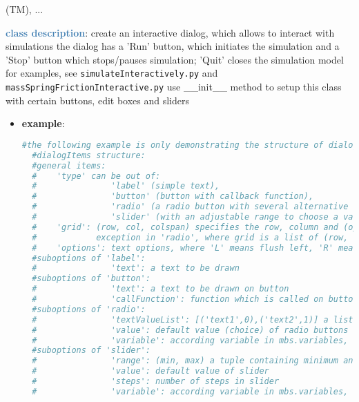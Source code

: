 \begin{itemize}[leftmargin=1.4cm]
\begin{itemize}[leftmargin=1.4cm]
\begin{itemize}[leftmargin=0.5cm]
\begin{itemize}[leftmargin=1.4cm]
\begin{itemize}[leftmargin=1.4cm]
\begin{itemize}[leftmargin=0.5cm]
\begin{itemize}[leftmargin=1.4cm]
\begin{itemize}[leftmargin=0.5cm]
\begin{itemize}[leftmargin=1.4cm]
\begin{itemize}[leftmargin=1.4cm]
 (TM), 
 ...

\ei

%
\noindent\textcolor{steelblue}{{\bf class description}}:  create an interactive dialog, which allows to interact with simulations
the dialog has a 'Run' button, which initiates the simulation and a 'Stop' button which stops/pauses simulation; 'Quit' closes the simulation model
for examples, see \texttt{simulateInteractively.py} and \texttt{massSpringFrictionInteractive.py}
use \_\_init\_\_ method to setup this class with certain buttons, edit boxes and sliders
\setlength{\itemindent}{0.7cm}
\begin{itemize}[leftmargin=0.7cm]
\item[--]{\bf example}: \vspace{-12pt}\ei\begin{lstlisting}[language=Python, xleftmargin=36pt]
  #the following example is only demonstrating the structure of dialogItems and plots
  #dialogItems structure:
  #general items:
  #    'type' can be out of:
  #               'label' (simple text),
  #               'button' (button with callback function),
  #               'radio' (a radio button with several alternative options),
  #               'slider' (with an adjustable range to choose a value)
  #    'grid': (row, col, colspan) specifies the row, column and (optionally) the span of columns the item is placed at;
  #            exception in 'radio', where grid is a list of (row, col) for every choice
  #    'options': text options, where 'L' means flush left, 'R' means flush right
  #suboptions of 'label':
  #               'text': a text to be drawn
  #suboptions of 'button':
  #               'text': a text to be drawn on button
  #               'callFunction': function which is called on button-press
  #suboptions of 'radio':
  #               'textValueList': [('text1',0),('text2',1)] a list of texts with according values
  #               'value': default value (choice) of radio buttons
  #               'variable': according variable in mbs.variables, which is set to current radio button value
  #suboptions of 'slider':
  #               'range': (min, max) a tuple containing minimum and maximum value of slider
  #               'value': default value of slider
  #               'steps': number of steps in slider
  #               'variable': according variable in mbs.variables, which is set to current slider value

\end{lstlisting}
\end{itemize}
\end{itemize}
\end{itemize}
\end{itemize}
\end{itemize}
\end{itemize}
\end{itemize}
\end{itemize}
\end{itemize}
\end{itemize}
\end{itemize}
